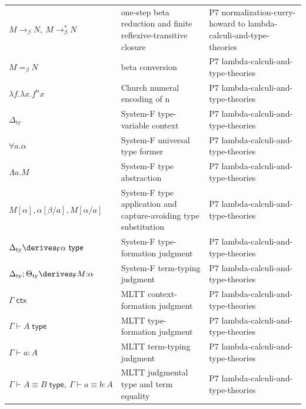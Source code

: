 \begin{longtable}{@{}p{}p{}p{}@{}}
\(M\longrightarrow_{\beta}N,\allowbreak \ M\longrightarrow_{\beta}^{*}N\) & one-step beta reduction and finite reflexive-transitive closure & P7 normalization-\allowbreak{}curry-\allowbreak{}howard to lambda-\allowbreak{}calculi-\allowbreak{}and-\allowbreak{}type-\allowbreak{}theories \\
\(M=_{\beta}N\) & beta conversion & P7 lambda-\allowbreak{}calculi-\allowbreak{}and-\allowbreak{}type-\allowbreak{}theories \\
\(\lambda f.\lambda x.f^n x\) & Church numeral encoding of n & P7 lambda-\allowbreak{}calculi-\allowbreak{}and-\allowbreak{}type-\allowbreak{}theories \\
\(\Delta_{\mathrm{ty}}\) & System-F type-variable context & P7 lambda-\allowbreak{}calculi-\allowbreak{}and-\allowbreak{}type-\allowbreak{}theories \\
\(\forall a.\alpha\) & System-F universal type former & P7 lambda-\allowbreak{}calculi-\allowbreak{}and-\allowbreak{}type-\allowbreak{}theories \\
\(\Lambda a.M\) & System-F type abstraction & P7 lambda-\allowbreak{}calculi-\allowbreak{}and-\allowbreak{}type-\allowbreak{}theories \\
\(M[\alpha],\allowbreak \alpha[\beta/a],\allowbreak M[\alpha/a]\) & System-F type application and capture-avoiding type substitution & P7 lambda-\allowbreak{}calculi-\allowbreak{}and-\allowbreak{}type-\allowbreak{}theories \\
\(\Delta_{\mathrm{ty}}\derives_{\mathsf F}\alpha\ \mathsf{type}\) & System-F type-formation judgment & P7 lambda-\allowbreak{}calculi-\allowbreak{}and-\allowbreak{}type-\allowbreak{}theories \\
\(\Delta_{\mathrm{ty}};\allowbreak \Theta_{\mathrm{ty}}\derives_{\mathsf F}M{:}\alpha\) & System-F term-typing judgment & P7 lambda-\allowbreak{}calculi-\allowbreak{}and-\allowbreak{}type-\allowbreak{}theories \\
\(\Gamma\;\mathsf{ctx}\) & MLTT context-formation judgment & P7 lambda-\allowbreak{}calculi-\allowbreak{}and-\allowbreak{}type-\allowbreak{}theories \\
\(\Gamma\vdash A\;\mathsf{type}\) & MLTT type-formation judgment & P7 lambda-\allowbreak{}calculi-\allowbreak{}and-\allowbreak{}type-\allowbreak{}theories \\
\(\Gamma\vdash a:A\) & MLTT term-typing judgment & P7 lambda-\allowbreak{}calculi-\allowbreak{}and-\allowbreak{}type-\allowbreak{}theories \\
\(\Gamma\vdash A\equiv B\;\mathsf{type},\allowbreak \ \Gamma\vdash a\equiv b:A\) & MLTT judgmental type and term equality & P7 lambda-\allowbreak{}calculi-\allowbreak{}and-\allowbreak{}type-\allowbreak{}theories \\

\end{longtable}

